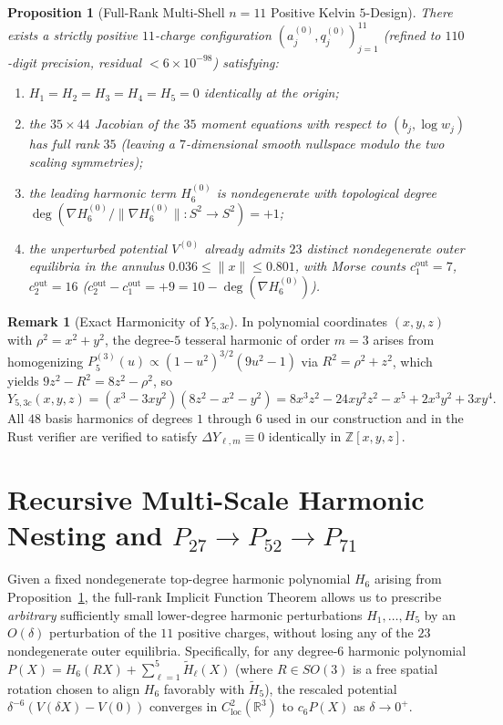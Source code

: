 \documentclass[11pt,a4paper]{amsart}
\newtheorem{proposition}[theorem]{Proposition}
\theoremstyle{definition}
\newtheorem{remark}[theorem]{Remark}
\newcommand{\R}{\mathbb{R}}
\newcommand{\Z}{\mathbb{Z}}
\begin{document}
\begin{proposition}[Full-Rank Multi-Shell $n = 11$ Positive Kelvin $5$-Design]\label{prop:design}
There exists a strictly positive $11$-charge configuration
$(a_j^{(0)}, q_j^{(0)})_{j=1}^{11}$ (refined to $110$-digit precision,
residual $< 6 \times 10^{-98}$) satisfying:
\begin{enumerate}
  \item $H_1 = H_2 = H_3 = H_4 = H_5 = 0$ identically at the origin;
  \item the $35 \times 44$ Jacobian of the $35$ moment equations with respect
  to $(b_j, \log w_j)$ has full rank $35$ (leaving a $7$-dimensional smooth
  nullspace modulo the two scaling symmetries);
  \item the leading harmonic term $H_6^{(0)}$ is nondegenerate with topological
  degree $\deg(\nabla H_6^{(0)} / \|\nabla H_6^{(0)}\| : S^2 \to S^2) = +1$;
  \item the unperturbed potential $V^{(0)}$ already admits $23$ distinct
  nondegenerate outer equilibria in the annulus $0.036 \le \|x\| \le 0.801$,
  with Morse counts $c_1^{\mathrm{out}} = 7$, $c_2^{\mathrm{out}} = 16$
  ($c_2^{\mathrm{out}} - c_1^{\mathrm{out}} = +9 = 10 - \deg(\nabla H_6^{(0)})$).
\end{enumerate}
\end{proposition}

\begin{remark}[Exact Harmonicity of $Y_{5,3c}$]
In polynomial coordinates $(x,y,z)$ with $\rho^2 = x^2 + y^2$, the degree-$5$
tesseral harmonic of order $m = 3$ arises from homogenizing
$P_5^{(3)}(u) \propto (1 - u^2)^{3/2}(9u^2 - 1)$ via $R^2 = \rho^2 + z^2$, which
yields $9z^2 - R^2 = 8z^2 - \rho^2$, so
\[
  Y_{5,3c}(x,y,z) = (x^3 - 3xy^2)(8z^2 - x^2 - y^2)
  = 8x^3 z^2 - 24 x y^2 z^2 - x^5 + 2 x^3 y^2 + 3 x y^4.
\]
All $48$ basis harmonics of degrees $1$ through $6$ used in our construction
and in the Rust verifier are verified to satisfy $\Delta Y_{\ell,m} \equiv 0$
identically in $\Z[x,y,z]$.
\end{remark}

\section{Recursive Multi-Scale Harmonic Nesting and $P_{27} \to P_{52} \to P_{71}$}\label{sec:nesting}

Given a fixed nondegenerate top-degree harmonic polynomial $H_6$ arising from
Proposition~\ref{prop:design}, the full-rank Implicit Function Theorem allows us
to prescribe \emph{arbitrary} sufficiently small lower-degree harmonic
perturbations $H_1, \dots, H_5$ by an $O(\delta)$ perturbation of the $11$
positive charges, without losing any of the $23$ nondegenerate outer equilibria.
Specifically, for any degree-$6$ harmonic polynomial
$P(X) = H_6(R X) + \sum_{\ell=1}^5 \tilde{H}_\ell(X)$ (where $R \in SO(3)$ is a
free spatial rotation chosen to align $H_6$ favorably with $\tilde{H}_5$), the
rescaled potential $\delta^{-6}(V(\delta X) - V(0))$ converges in
$C^2_{\mathrm{loc}}(\R^3)$ to $c_6 P(X)$ as $\delta \to 0^+$.
\end{document}

